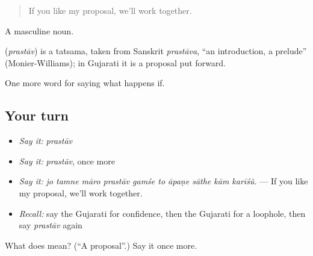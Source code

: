 \begin{quote}
If you like my proposal, we'll work together.
\end{quote}

A masculine noun.

\begin{cousinweb}
\textbf{} (\emph{prastāv}) is a tatsama, taken from Sanskrit \emph{prastāva}, \textquotedblleft{}an introduction, a prelude\textquotedblright{} (Monier-Williams); in Gujarati it is a proposal put forward.
\end{cousinweb}

\begin{grammarlens}[title={What you've built}]
One more word for saying what happens if.
\end{grammarlens}

\subsection*{Your turn}
\begin{itemize}
\raggedright
  \item \emph{Say it:} \emph{prastāv}
  \item \emph{Say it:} \emph{prastāv}, once more
  \item \emph{Say it:} \emph{jo tamne māro prastāv gamśe to āpaṇe sāthe kām karīśũ.} — If you like my proposal, we'll work together.
  \item \emph{Recall:} say the Gujarati for confidence, then the Gujarati for a loophole, then say \emph{prastāv} again
\end{itemize}

\begin{tcolorbox}[breakable,colback=teal!4,colframe=teal!35!black,title={Before you move on}]
What does  mean? (\textquotedblleft{}A proposal\textquotedblright{}.) Say it once more.
\end{tcolorbox}
